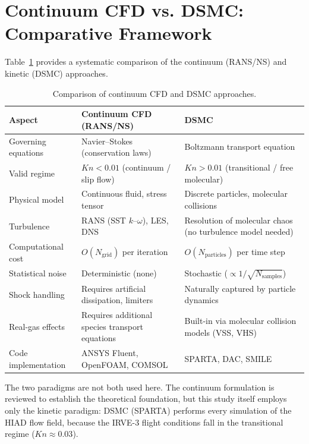 \section{Continuum CFD vs. DSMC: Comparative Framework}

Table~\ref{tab:cfd_vs_dsmc} provides a systematic comparison of the continuum (RANS/NS) and kinetic (DSMC) approaches.

\begin{table}[H]
    \centering
    \caption{Comparison of continuum CFD and DSMC approaches.}
    \label{tab:cfd_vs_dsmc}
    \begin{tabularx}{\textwidth}{|>{\RaggedRight\arraybackslash}p{}|>{\RaggedRight\arraybackslash}X|>{\RaggedRight\arraybackslash}X|}
    \hline
    \textbf{Aspect} & \textbf{Continuum CFD (RANS/NS)} & \textbf{DSMC} \\ \hline
    Governing equations & Navier--Stokes (conservation laws) & Boltzmann transport equation \\ \hline
    Valid regime & $Kn < 0.01$ (continuum / slip flow) & $Kn > 0.01$ (transitional / free molecular) \\ \hline
    Physical model & Continuous fluid, stress tensor & Discrete particles, molecular collisions \\ \hline
    Turbulence & RANS (SST $k$--$\omega$), LES, DNS & Resolution of molecular chaos (no turbulence model needed) \\ \hline
    Computational cost & $O(N_{\text{grid}})$ per iteration & $O(N_{\text{particles}})$ per time step \\ \hline
    Statistical noise & Deterministic (none) & Stochastic ($\propto 1/\sqrt{N_{\text{samples}}}$) \\ \hline
    Shock handling & Requires artificial dissipation, limiters & Naturally captured by particle dynamics \\ \hline
    Real-gas effects & Requires additional species transport equations & Built-in via molecular collision models (VSS, VHS) \\ \hline
    Code implementation & ANSYS Fluent, OpenFOAM, COMSOL & SPARTA, DAC, SMILE \\ \hline
    \end{tabularx}
\end{table}

\noindent The two paradigms are not both used here. The continuum formulation is reviewed to establish the theoretical foundation, but this study itself employs only the kinetic paradigm: DSMC (SPARTA) performs every simulation of the HIAD flow field, because the IRVE-3 flight conditions fall in the transitional regime ($Kn \approx 0.03$).

